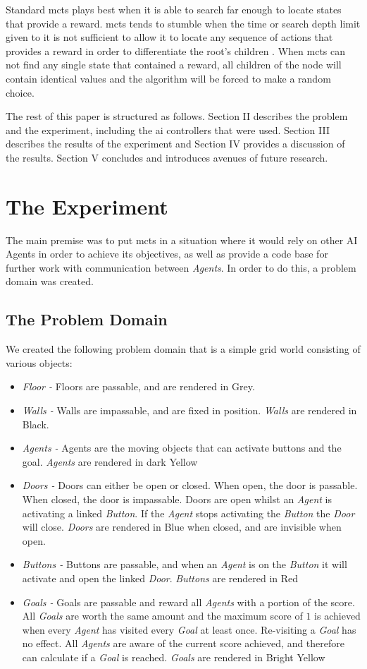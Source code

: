 \documentclass{IEEEtran}
\begin{document}
Standard \gls{mcts} plays best when it is able to search far enough to locate states that provide a reward. \gls{mcts} tends to stumble when the time or search depth limit given to it is not sufficient to allow it to locate any sequence of actions that provides a reward in order to differentiate the root's children \cite{perez2012monte}. When \gls{mcts} can not find any single state that contained a reward, all children of the node will contain identical values and the algorithm will be forced to make a random choice.

The rest of this paper is structured as follows. Section II describes the problem and the experiment, including the \gls{ai} controllers that were used. Section III describes the results of the experiment and Section IV provides a discussion of the results. Section V concludes and introduces avenues of future research.
\section{The Experiment}
The main premise was to put \gls{mcts} in a situation where it would rely on other AI Agents in order to achieve its objectives, as well as provide a code base for further work with communication between \emph{Agents}. In order to do this, a problem domain was created.
\subsection{The Problem Domain}
We created the following problem domain that is a simple grid world consisting of various objects:
\begin{itemize}
\item{\emph{Floor - } Floors are passable, and are rendered in Grey.}
\item{\emph{Walls -} Walls are impassable, and are fixed in position. \emph{Walls} are rendered in Black.}
\item{\emph{Agents -} Agents are the moving objects that can activate buttons and the goal. \emph{Agents} are rendered in dark Yellow}
\item{\emph{Doors -} Doors can either be open or closed. When open, the door is passable. When closed, the door is impassable. Doors are open whilst an \emph{Agent} is activating a linked \emph{Button}. If the \emph{Agent} stops activating the \emph{Button} the \emph{Door} will close. \emph{Doors} are rendered in Blue when closed, and are invisible when open.}
\item{\emph{Buttons -} Buttons are passable, and when an \emph{Agent} is on the \emph{Button} it will activate and open the linked \emph{Door}. \emph{Buttons} are rendered in Red}
\item{\emph{Goals -} Goals are passable and reward all \emph{Agents} with a portion of the score. All \emph{Goals} are worth the same amount and the maximum score of $1$ is achieved when every \emph{Agent} has visited every \emph{Goal} at least once. Re-visiting a \emph{Goal} has no effect. All \emph{Agents} are aware of the current score achieved, and therefore can calculate if a \emph{Goal} is reached. \emph{Goals} are rendered in Bright Yellow}
\end{itemize}
\end{document}
